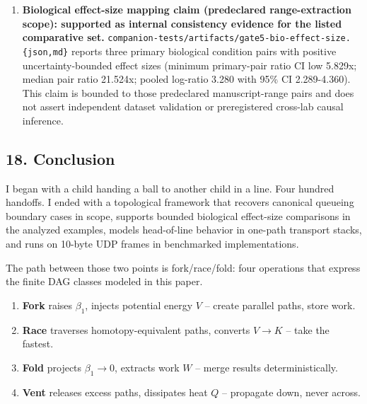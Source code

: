 \documentclass[
  11pt,
]{article}
\begin{document}
\begin{enumerate}
  \textbf{Out-of-sample \(R_{\text{qr}}\) predictive-screening claim
  (model scope): supported for the tested simulator family.}
  \texttt{companion-\allowbreak{}tests/\allowbreak{}artifacts/\allowbreak{}gate4-\allowbreak{}rqr-\allowbreak{}holdout.\allowbreak{}\{json,md\}}
  reports independent train/holdout validation with predeclared scoring
  criteria: Spearman CI low 0.446, slope CI low 0.427, quartile-delta CI
  low 0.100, predictor-correlation CI low 0.176, and decile monotonicity
  violations 1 \textless= 3. This claim is bounded to the tested
  simulator family and does not assert real-world deployment
  predictivity.
\item
  \textbf{Biological effect-size mapping claim (predeclared
  range-extraction scope): supported as internal consistency evidence
  for the listed comparative set.}
  \texttt{companion-\allowbreak{}tests/\allowbreak{}artifacts/\allowbreak{}gate5-\allowbreak{}bio-\allowbreak{}effect-\allowbreak{}size.\allowbreak{}\{json,md\}}
  reports three primary biological condition pairs with positive
  uncertainty-bounded effect sizes (minimum primary-pair ratio CI low
  5.829x; median pair ratio 21.524x; pooled log-ratio 3.280 with 95\% CI
  2.289-4.360). This claim is bounded to those predeclared
  manuscript-range pairs and does not assert independent dataset
  validation or preregistered cross-lab causal inference.
\end{enumerate}

\subsection{18. Conclusion}\label{conclusion}

I began with a child handing a ball to another child in a line. Four
hundred handoffs. I ended with a topological framework that recovers
canonical queueing boundary cases in scope, supports bounded biological
effect-size comparisons in the analyzed examples, models head-of-line
behavior in one-path transport stacks, and runs on 10-byte UDP frames in
benchmarked implementations.

The path between those two points is fork/race/fold: four operations
that express the finite DAG classes modeled in this paper.

\begin{enumerate}
\def\labelenumi{\arabic{enumi}.}
\item
  \textbf{Fork} raises \(\beta_1\), injects potential energy \(V\) --
  create parallel paths, store work.
\item
  \textbf{Race} traverses homotopy-equivalent paths, converts
  \(V \to K\) -- take the fastest.
\item
  \textbf{Fold} projects \(\beta_1 \to 0\), extracts work \(W\) -- merge
  results deterministically.
\item
  \textbf{Vent} releases excess paths, dissipates heat \(Q\) --
  propagate down, never across.
\end{enumerate}
\end{document}
